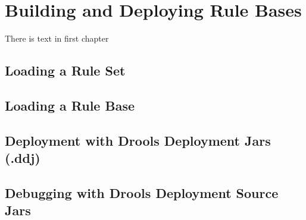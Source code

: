 \chapter{Building and Deploying Rule Bases}
There is text in first chapter

\section{Loading a Rule Set}

\section{Loading a Rule Base}

\section{Deployment with Drools Deployment Jars (.ddj)}

\section{Debugging with Drools Deployment Source Jars }

